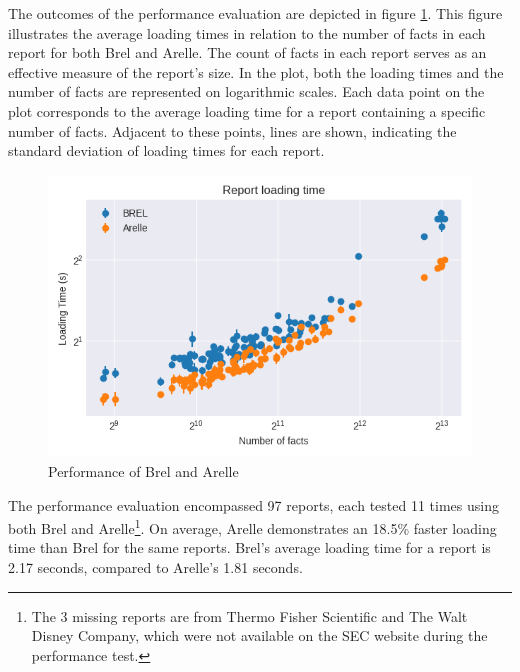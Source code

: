 The outcomes of the performance evaluation are depicted in figure \ref{fig:performance}.  
This figure illustrates the average loading times in relation to the number of facts in each report for both Brel and Arelle.  
The count of facts in each report serves as an effective measure of the report's size.  
In the plot, both the loading times and the number of facts are represented on logarithmic scales.  
Each data point on the plot corresponds to the average loading time for a report containing a specific number of facts.  
Adjacent to these points, lines are shown, indicating the standard deviation of loading times for each report.

\begin{figure}[H]
    \centering
    \includegraphics[width=\textwidth]{images/performance_graph.png}
    \caption{Performance of Brel and Arelle}
    \label{fig:performance}
\end{figure}

The performance evaluation encompassed 97 reports, each tested 11 times using both Brel and Arelle\footnote{The 3 missing reports are from Thermo Fisher Scientific and The Walt Disney Company, which were not available on the SEC website during the performance test.}.
On average, Arelle demonstrates an 18.5\% faster loading time than Brel for the same reports.
Brel's average loading time for a report is 2.17 seconds, compared to Arelle's 1.81 seconds.

